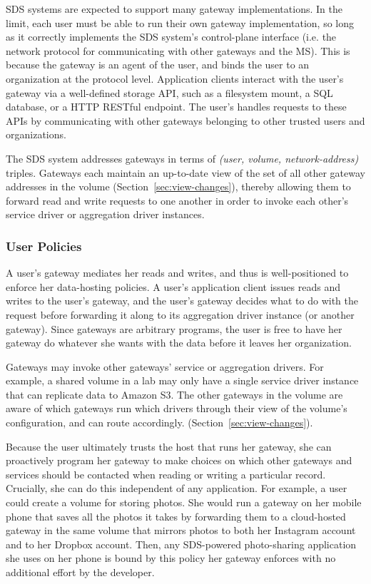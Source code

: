 SDS systems are expected to support many gateway implementations.  In the limit,
each user must be able to run their own gateway implementation, so long as it
correctly implements the SDS system's control-plane interface (i.e. the network protocol
for communicating with other gateways and the MS).  This is because
the gateway is an agent of the user, and binds the user to an organization at
the protocol level.  Application clients interact with the user's gateway via a
well-defined storage API, such as a filesystem mount, a SQL database, or a
HTTP RESTful endpoint.  The user's handles requests to these APIs by communicating
with other gateways belonging to other trusted users and organizations.

The SDS system addresses gateways in terms of \textit{(user, volume,
network-address)} triples.  Gateways each maintain an up-to-date view of the set
of all other gateway addresses in the volume (Section~\ref{sec:view-changes}),
thereby allowing them to forward read and write requests to one another in order
to invoke each other's service driver or aggregation driver instances.

\subsubsection{User Policies}

A user's gateway mediates her reads and writes, and thus is well-positioned to enforce her data-hosting
policies.  A user's application client issues reads and writes to the user's
gateway, and the user's gateway decides what to do with the request before
forwarding it along to its aggregation driver instance (or another gateway).
Since gateways are arbitrary programs, the user is free to have her gateway do
whatever she wants with the data before it leaves her organization.

Gateways may invoke other gateways' service or aggregation drivers.  For
example, a shared volume in a lab may only have a single service driver instance
that can replicate data to Amazon S3.  The other gateways in the volume are
aware of which gateways run which drivers through their view of the volume's
configuration, and can route accordingly.
(Section~\ref{sec:view-changes}).

Because the user ultimately trusts the host that runs her gateway, she can
proactively program her gateway to make choices on which other gateways and
services should be contacted when reading or writing a particular record.
Crucially, she can do this independent of any application.  For example, a user
could create a volume for storing photos.  She would run
a gateway on her mobile phone that saves all the photos it takes
by forwarding them to a cloud-hosted gateway in the same volume
that mirrors photos to both her Instagram account and to her Dropbox account.
Then, any SDS-powered photo-sharing application she uses on her phone is bound
by this policy her gateway enforces with no additional effort by the developer.

